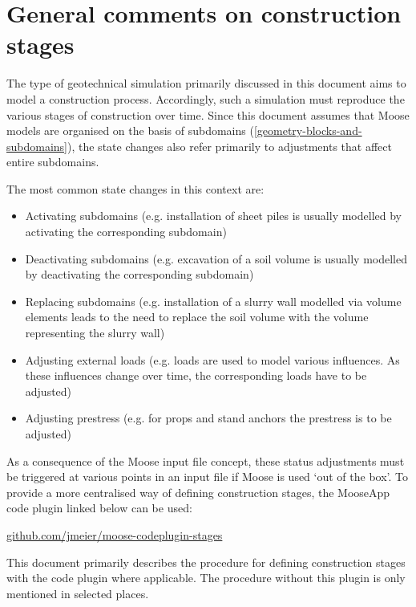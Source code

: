 \section{General comments on construction stages}
\label{chap:stages-general}

The type of geotechnical simulation primarily discussed in this document aims
to model a construction process. Accordingly, such a simulation must reproduce
the various stages of construction over time. Since this document assumes that
Moose models are organised on the basis of subdomains
(\autoref{geometry-blocks-and-subdomains}), the state changes also refer
primarily to adjustments that affect entire subdomains.

The most common state changes in this context are:

\begin{itemize}
    \item Activating subdomains (e.g. installation of sheet piles is usually modelled by
          activating the corresponding subdomain)
    \item Deactivating subdomains (e.g. excavation of a soil volume is usually modelled
          by deactivating the corresponding subdomain)
    \item Replacing subdomains (e.g. installation of a slurry wall modelled via volume
          elements leads to the need to replace the soil volume with the volume
          representing the slurry wall)
    \item Adjusting external loads (e.g. loads are used to model various influences. As
          these influences change over time, the corresponding loads have to be adjusted)
    \item Adjusting prestress (e.g. for props and stand anchors the prestress is to be
          adjusted)
\end{itemize}

As a consequence of the Moose input file concept, these status adjustments must
be triggered at various points in an input file if Moose is used ‘out of the
box’. To provide a more centralised way of defining construction stages, the
\codeword{[Stages]} MooseApp code plugin linked below can be used:

\href{https://github.com/jmeier/moose-codeplugin-stages}{github.com/jmeier/moose-codeplugin-stages}

This document primarily describes the procedure for defining construction
stages with the \codeword{[Stages]} code plugin where applicable. The procedure
without this plugin is only mentioned in selected places.

